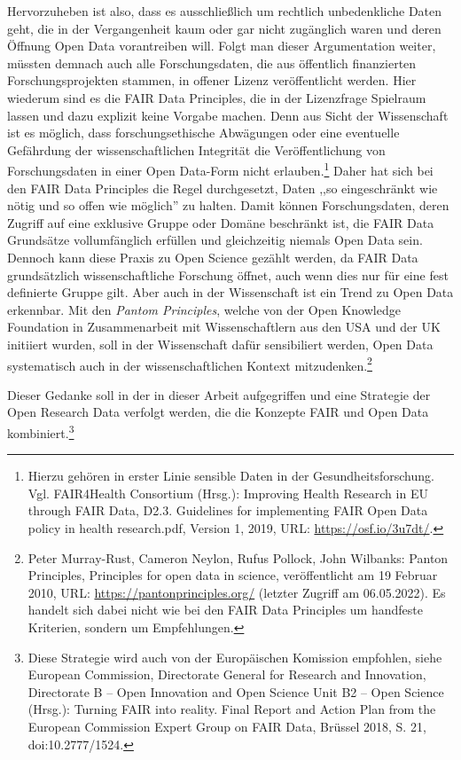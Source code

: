 Hervorzuheben ist also, dass es ausschließlich um rechtlich unbedenkliche Daten geht, die in der Vergangenheit kaum oder gar nicht zugänglich waren und deren Öffnung Open Data vorantreiben will. Folgt man dieser Argumentation weiter, müssten demnach auch alle Forschungsdaten, die aus öffentlich finanzierten Forschungsprojekten stammen, in offener Lizenz veröffentlicht werden. Hier wiederum sind es die FAIR Data Principles, die in der Lizenzfrage Spielraum lassen und dazu explizit keine Vorgabe machen. Denn aus Sicht der Wissenschaft ist es möglich, dass forschungsethische Abwägungen oder eine eventuelle Gefährdung der wissenschaftlichen Integrität die Veröffentlichung von Forschungsdaten in einer Open Data-Form nicht erlauben.\footnote{Hierzu gehören in erster Linie sensible Daten in der Gesundheitsforschung. Vgl. FAIR4Health Consortium (Hrsg.): Improving Health Research in EU through FAIR Data, D2.3. Guidelines for implementing FAIR Open Data policy in health research.pdf, Version 1, 2019, URL: \url{https://osf.io/3u7dt/}.} Daher hat sich bei den FAIR Data Principles die Regel durchgesetzt, Daten ,,so eingeschränkt wie nötig und so offen wie möglich'' zu halten. Damit können Forschungsdaten, deren Zugriff auf eine exklusive Gruppe oder Domäne beschränkt ist, die FAIR Data Grundsätze vollumfänglich erfüllen und gleichzeitig niemals Open Data sein. Dennoch kann diese Praxis zu Open Science gezählt werden, da FAIR Data grundsätzlich wissenschaftliche Forschung öffnet, auch wenn dies nur für eine fest definierte Gruppe gilt. Aber auch in der Wissenschaft ist ein Trend zu Open Data erkennbar. Mit den \textit{Pantom Principles}, welche von der Open Knowledge Foundation in Zusammenarbeit mit Wissenschaftlern aus den USA und der UK initiiert wurden, soll in der Wissenschaft dafür sensibiliert werden, Open Data systematisch auch in der wissenschaftlichen Kontext mitzudenken.\footnote{Peter Murray-Rust, Cameron Neylon, Rufus Pollock, John Wilbanks: Panton Principles, Principles for open data in science, veröffentlicht am 19 Februar 2010, URL: \url{https://pantonprinciples.org/} (letzter Zugriff am 06.05.2022). Es handelt sich dabei nicht wie bei den FAIR Data Principles um handfeste Kriterien, sondern um Empfehlungen.} 

Dieser Gedanke soll in der in dieser Arbeit aufgegriffen und eine Strategie der Open Research Data verfolgt werden, die die Konzepte FAIR und Open Data kombiniert.\footnote{Diese Strategie wird auch von der Europäischen Komission empfohlen, siehe European Commission, Directorate General for Research and Innovation, Directorate B – Open Innovation and Open Science Unit B2 – Open Science (Hrsg.): Turning FAIR into reality. Final Report and Action Plan from the European Commission Expert Group on FAIR Data, Brüssel 2018, S. 21, doi:10.2777/1524.}
